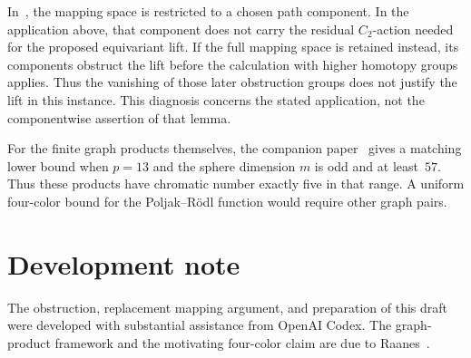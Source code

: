 \documentclass[11pt]{amsart}
\theoremstyle{definition}
\theoremstyle{remark}
\numberwithin{equation}{section}
\begin{document}
In~\cite[Lemma~3.1]{BasuGhosh}, the mapping space is restricted to a chosen path component. In the application above, that component does not carry the residual $C_2$-action needed for the proposed equivariant lift. If the full mapping space is retained instead, its components obstruct the lift before the calculation with higher homotopy groups applies. Thus the vanishing of those later obstruction groups does not justify the lift in this instance. This diagnosis concerns the stated application, not the componentwise assertion of that lemma.

For the finite graph products themselves, the companion paper~\cite[Corollary~5.2]{Companion} gives a matching lower bound when $p=13$ and the sphere dimension $m$ is odd and at least~$57$. Thus these products have chromatic number exactly five in that range. A uniform four-color bound for the Poljak--R\"odl function would require other graph pairs.

\section*{Development note}
The obstruction, replacement mapping argument, and preparation of this draft were developed with substantial assistance from OpenAI Codex. The graph-product framework and the motivating four-color claim are due to Raanes~\cite{Raanes}.
\end{document}
